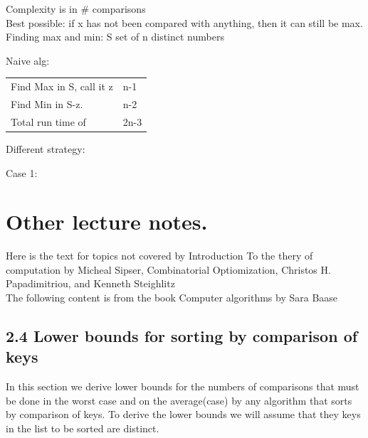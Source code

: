 \documentclass[a4paper,10pt,titlepage]{report}
\begin{document}
Complexity is in \# comparisons\\

Best possible: if x has not been compared with anything, then it can still be max.\\

Finding max and min: S set of n distinct numbers\\
\vspace{5mm}

Naive alg:\\
\begin{tabular}{ll}
Find Max in S, call it z & n-1\\
Find Min in S-z. & n-2\\
Total run time of & 2n-3
\end{tabular}

Different strategy:

Case 1:


\chapter{Other lecture notes.}
Here is the text for topics not covered by Introduction To the thery of computation by Micheal Sipser, Combinatorial Optiomization, Christos H. Papadimitriou, and Kenneth Steighlitz\\

The following content is from the book Computer algorithms by Sara Baase\\
\newpage
\section{2.4 Lower bounds for sorting by comparison of keys}
In this section we derive lower bounds for the numbers of comparisons that must be done in the worst case and on the average(case) by any algorithm that sorts by comparison of keys. To derive the lower bounds we will assume that they keys in the list to be sorted are distinct.
\end{document}
